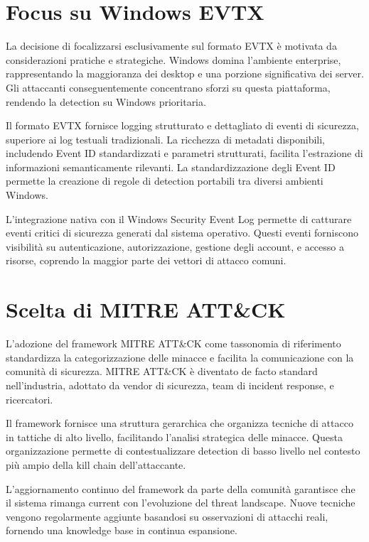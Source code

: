 \documentclass[12pt,a4paper]{report}
\theoremstyle{definition}
\begin{document}
\section{Focus su Windows EVTX}

La decisione di focalizzarsi esclusivamente sul formato EVTX è motivata da considerazioni pratiche e strategiche. Windows domina l'ambiente enterprise, rappresentando la maggioranza dei desktop e una porzione significativa dei server. Gli attaccanti conseguentemente concentrano sforzi su questa piattaforma, rendendo la detection su Windows prioritaria.

Il formato EVTX fornisce logging strutturato e dettagliato di eventi di sicurezza, superiore ai log testuali tradizionali. La ricchezza di metadati disponibili, includendo Event ID standardizzati e parametri strutturati, facilita l'estrazione di informazioni semanticamente rilevanti. La standardizzazione degli Event ID permette la creazione di regole di detection portabili tra diversi ambienti Windows.

L'integrazione nativa con il Windows Security Event Log permette di catturare eventi critici di sicurezza generati dal sistema operativo. Questi eventi forniscono visibilità su autenticazione, autorizzazione, gestione degli account, e accesso a risorse, coprendo la maggior parte dei vettori di attacco comuni.

\section{Scelta di MITRE ATT\&CK}

L'adozione del framework MITRE ATT\&CK come tassonomia di riferimento standardizza la categorizzazione delle minacce e facilita la comunicazione con la comunità di sicurezza. MITRE ATT\&CK è diventato de facto standard nell'industria, adottato da vendor di sicurezza, team di incident response, e ricercatori.

Il framework fornisce una struttura gerarchica che organizza tecniche di attacco in tattiche di alto livello, facilitando l'analisi strategica delle minacce. Questa organizzazione permette di contestualizzare detection di basso livello nel contesto più ampio della kill chain dell'attaccante.

L'aggiornamento continuo del framework da parte della comunità garantisce che il sistema rimanga current con l'evoluzione del threat landscape. Nuove tecniche vengono regolarmente aggiunte basandosi su osservazioni di attacchi reali, fornendo una knowledge base in continua espansione.
\end{document}
